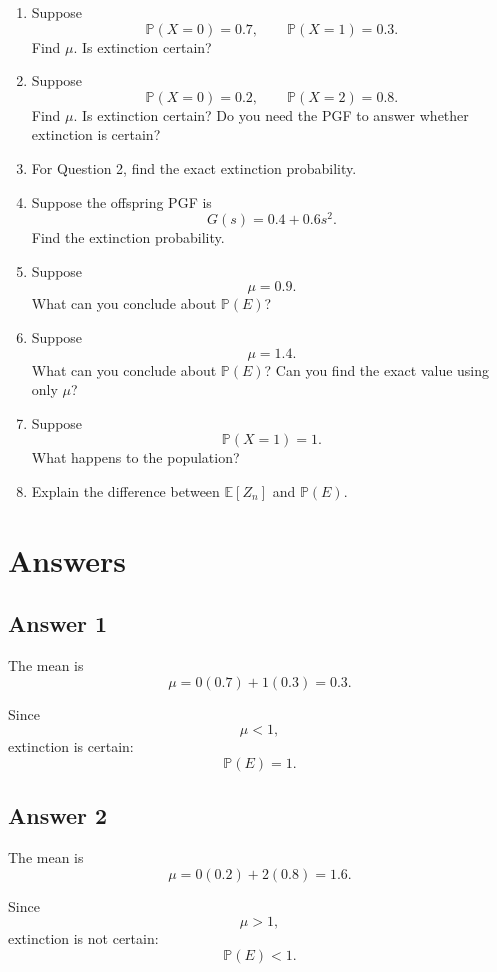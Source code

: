 \documentclass[12pt,a4paper]{article}
\theoremstyle{notestyle}
\newcommand{\Prob}{\mathbb{P}}
\newcommand{\E}{\mathbb{E}}
\begin{document}
\begin{enumerate}[label=\textbf{Q\arabic*.}, leftmargin=1.2cm]
    \item Suppose
    \[
    \Prob(X=0)=0.7,\qquad \Prob(X=1)=0.3.
    \]
    Find $\mu$. Is extinction certain?

    \item Suppose
    \[
    \Prob(X=0)=0.2,\qquad \Prob(X=2)=0.8.
    \]
    Find $\mu$. Is extinction certain? Do you need the PGF to answer whether extinction is certain?

    \item For Question 2, find the exact extinction probability.

    \item Suppose the offspring PGF is
    \[
    G(s)=0.4+0.6s^2.
    \]
    Find the extinction probability.

    \item Suppose
    \[
    \mu=0.9.
    \]
    What can you conclude about $\Prob(E)$?

    \item Suppose
    \[
    \mu=1.4.
    \]
    What can you conclude about $\Prob(E)$? Can you find the exact value using only $\mu$?

    \item Suppose
    \[
    \Prob(X=1)=1.
    \]
    What happens to the population?

    \item Explain the difference between $\E[Z_n]$ and $\Prob(E)$.
\end{enumerate}

\section{Answers}

\subsection*{Answer 1}

The mean is
\[
\mu=0(0.7)+1(0.3)=0.3.
\]

Since
\[
\mu<1,
\]
extinction is certain:
\[
\boxed{\Prob(E)=1.}
\]

\subsection*{Answer 2}

The mean is
\[
\mu=0(0.2)+2(0.8)=1.6.
\]

Since
\[
\mu>1,
\]
extinction is not certain:
\[
\boxed{\Prob(E)<1.}
\]
\end{document}
